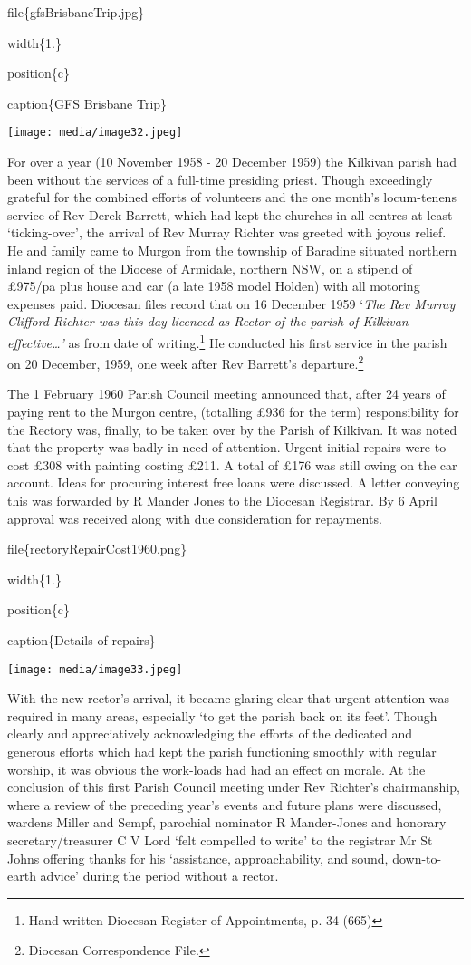 file\{gfsBrisbaneTrip.jpg\}

width\{1.\}

position\{c\}

caption\{GFS Brisbane Trip\}

\texttt{[image: media/image32.jpeg]}

For over a year (10 November 1958 - 20 December 1959) the Kilkivan parish had been without the services of a full-time presiding priest. Though exceedingly grateful for the combined efforts of volunteers and the one month's locum-tenens service of Rev Derek Barrett, which had kept the churches in all centres at least `ticking-over', the arrival of Rev Murray Richter was greeted with joyous relief. He and family came to Murgon from the township of Baradine situated northern inland region of the Diocese of Armidale, northern NSW, on a stipend of £975/pa plus house and car (a late 1958 model Holden) with all motoring expenses paid. Diocesan files record that on 16 December 1959 `\emph{The Rev Murray Clifford Richter was this day licenced as Rector of the parish of Kilkivan effective\ldots'} as from date of writing.\footnote{Hand-written Diocesan Register of Appointments, p. 34 (665)} He conducted his first service in the parish on 20 December, 1959, one week after Rev Barrett's departure.\footnote{Diocesan Correspondence File.}

The 1 February 1960 Parish Council meeting announced that, after 24 years of paying rent to the Murgon centre, (totalling £936 for the term) responsibility for the Rectory was, finally, to be taken over by the Parish of Kilkivan. It was noted that the property was badly in need of attention. Urgent initial repairs were to cost £308 with painting costing £211. A total of £176 was still owing on the car account. Ideas for procuring interest free loans were discussed. A letter conveying this was forwarded by R Mander Jones to the Diocesan Registrar. By 6 April approval was received along with due consideration for repayments.

file\{rectoryRepairCost1960.png\}

width\{1.\}

position\{c\}

caption\{Details of repairs\}

\texttt{[image: media/image33.jpeg]}

With the new rector's arrival, it became glaring clear that urgent attention was required in many areas, especially `to get the parish back on its feet'. Though clearly and appreciatively acknowledging the efforts of the dedicated and generous efforts which had kept the parish functioning smoothly with regular worship, it was obvious the work-loads had had an effect on morale. At the conclusion of this first Parish Council meeting under Rev Richter's chairmanship, where a review of the preceding year's events and future plans were discussed, wardens Miller and Sempf, parochial nominator R Mander-Jones and honorary secretary/treasurer C V Lord `felt compelled to write' to the registrar Mr St Johns offering thanks for his `assistance, approachability, and sound, down-to-earth advice' during the period without a rector.

